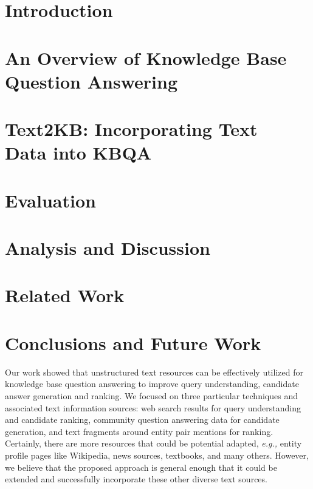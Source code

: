 \documentclass{sig-alternate-05-2015}
\newcommand{\eg}[0]{{\em e.g., }}
\begin{document}
%
%
%
%



\section{Introduction}
\label{section:intro}


\section{An Overview of Knowledge Base Question Answering}
\label{section:baseline}


\section{Text2KB: Incorporating Text\\ Data into KBQA}
\label{section:method}


\section{Evaluation}
\label{section:eval}


\section{Analysis and Discussion}
\label{section:analysis}


\section{Related Work}
\label{section:related_work}


\section{Conclusions and Future Work}

Our work showed that unstructured text resources can be effectively utilized for knowledge base question answering to improve query understanding,  candidate answer generation and ranking.
We focused on three particular techniques and associated text information sources: web search results for query understanding and candidate ranking, community question answering data for candidate generation, and text fragments around entity pair mentions for ranking.
Certainly, there are more resources that could be potential adapted, \eg entity profile pages like Wikipedia, news sources, textbooks, and many others.
However, we believe that the proposed approach is general enough that it could be extended and successfully incorporate these other diverse text sources.
\end{document}
